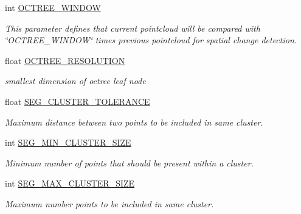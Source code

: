 \begin{DoxyCompactItemize}
int \hyperlink{classdatmo_1_1cloud__segmentation_ada1c6bd7f69249c5317cbe95969498e4}{O\+C\+T\+R\+E\+E\+\_\+\+W\+I\+N\+D\+OW}
\begin{DoxyCompactList}\small\item\em This parameter defines that current pointcloud will be compared with \char`\"{}\+O\+C\+T\+R\+E\+E\+\_\+\+W\+I\+N\+D\+O\+W\char`\"{} times previous pointcloud for spatial change detection. \end{DoxyCompactList}\item 
float \hyperlink{classdatmo_1_1cloud__segmentation_aba086f9f8e05f18c02c042c057854a06}{O\+C\+T\+R\+E\+E\+\_\+\+R\+E\+S\+O\+L\+U\+T\+I\+ON}
\begin{DoxyCompactList}\small\item\em smallest dimension of octree leaf node \end{DoxyCompactList}\item 
float \hyperlink{classdatmo_1_1cloud__segmentation_af33add7f3b00fac5be10ffd87eae057f}{S\+E\+G\+\_\+\+C\+L\+U\+S\+T\+E\+R\+\_\+\+T\+O\+L\+E\+R\+A\+N\+CE}
\begin{DoxyCompactList}\small\item\em Maximum distance between two points to be included in same cluster. \end{DoxyCompactList}\item 
int \hyperlink{classdatmo_1_1cloud__segmentation_acf7cfcaf0ab08a2afffcc2b47048bc81}{S\+E\+G\+\_\+\+M\+I\+N\+\_\+\+C\+L\+U\+S\+T\+E\+R\+\_\+\+S\+I\+ZE}
\begin{DoxyCompactList}\small\item\em Minimum number of points that should be present within a cluster. \end{DoxyCompactList}\item 
int \hyperlink{classdatmo_1_1cloud__segmentation_ab2959ad226faeaab4910f42ba91d37cb}{S\+E\+G\+\_\+\+M\+A\+X\+\_\+\+C\+L\+U\+S\+T\+E\+R\+\_\+\+S\+I\+ZE}
\begin{DoxyCompactList}\small\item\em Maximum number points to be included in same cluster. \end{DoxyCompactList}\end{DoxyCompactItemize}
